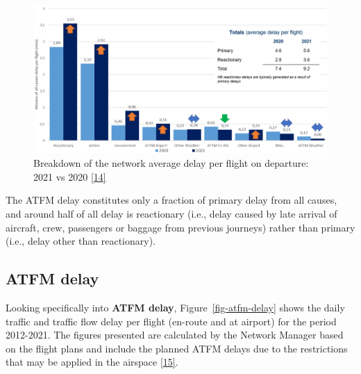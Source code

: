 \documentclass[
  11pt,
  a4paper,
]{book}
\begin{document}
\begin{figure}

{\centering \includegraphics{./figures/delay_causes.png}

}

\caption{\label{fig-all-causes-delay}Breakdown of the network average
delay per flight on departure: 2021 vs 2020
\protect\hyperlink{ref-coda2021}{{[}14{]}}}

\end{figure}

The ATFM delay constitutes only a fraction of primary delay from all
causes, and around half of all delay is reactionary (i.e., delay caused
by late arrival of aircraft, crew, passengers or baggage from previous
journeys) rather than primary (i.e., delay other than reactionary).

\hypertarget{atfm-delay}{%
\subsection{ATFM delay}\label{atfm-delay}}

Looking specifically into \textbf{ATFM delay},
Figure~\ref{fig-atfm-delay} shows the daily traffic and traffic flow
delay per flight (en-route and at airport) for the period 2012-2021. The
figures presented are calculated by the Network Manager based on the
flight plans and include the planned ATFM delays due to the restrictions
that may be applied in the airspace
\protect\hyperlink{ref-nm2022}{{[}15{]}}.
\end{document}
